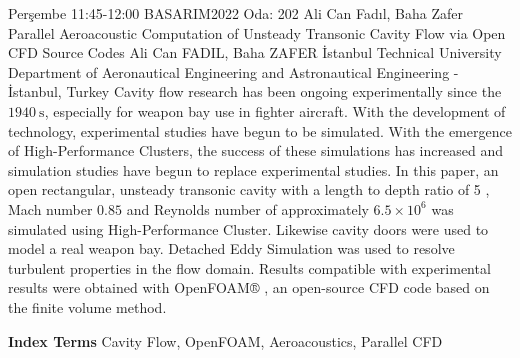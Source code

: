 
    \begin{abstract_basarim}
    {Perşembe 11:45-12:00}
    {BASARIM2022}
    {Oda: 202}
    {Ali Can Fadıl, Baha Zafer}
    {Parallel Aeroacoustic Computation of Unsteady Transonic Cavity Flow via Open CFD Source Codes}
    {%
    Ali Can FADIL, Baha ZAFER}
    {%
    }
    {%
    İstanbul Technical University Department of Aeronautical Engineering and Astronautical Engineering - İstanbul, Turkey}
    Cavity flow research has been ongoing experimentally since the $1940 \mathrm{~s}$, especially for weapon bay use in fighter aircraft. With the development of technology, experimental studies have begun to be simulated. With the emergence of High-Performance Clusters, the success of these simulations has increased and simulation studies have begun to replace experimental studies. In this paper, an open rectangular, unsteady transonic cavity with a length to depth ratio of 5 , Mach number $0.85$ and Reynolds number of approximately $6.5 \times 10^{6}$ was simulated using High-Performance Cluster. Likewise cavity doors were used to model a real weapon bay. Detached Eddy Simulation was used to resolve turbulent properties in the flow domain. Results compatible with experimental results were obtained with OpenFOAM® , an open-source CFD code based on the finite volume method. 
    
            \textbf{Index Terms} \newline{}Cavity Flow, OpenFOAM, Aeroacoustics, Parallel CFD
    \end{abstract_basarim}
    
